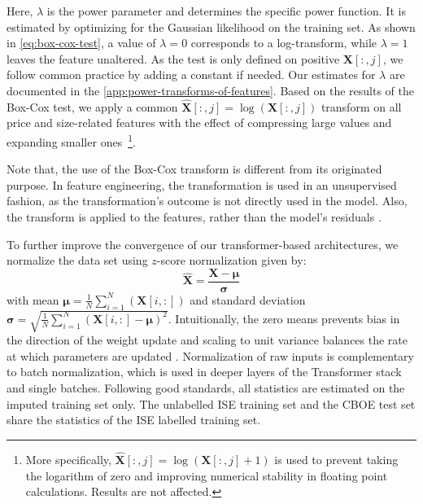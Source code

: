Here, $\lambda$ is the power parameter and determines the specific power function. It is estimated by optimizing for the Gaussian likelihood on the training set. As shown in \cref{eq:box-cox-test}, a value of $\lambda=0$ corresponds to a log-transform, while $\lambda=1$ leaves the feature unaltered. As the test is only defined on positive $\boldsymbol{X}\left[:,j\right]$, we follow common practice by adding a constant if needed. Our estimates for $\lambda$ are documented in the \cref{app:power-transforms-of-features}. Based on the results of the Box-Cox test, we apply a common $\widehat{\boldsymbol{X}}\left[:,j\right]=\log(\boldsymbol{X}\left[:,j\right])$ transform on all price and size-related features with the effect of compressing large values and expanding smaller ones~\footnote{More specifically, $\widehat{\boldsymbol{X}}\left[:,j\right]= \log(\boldsymbol{X}\left[:,j\right]+1)$ is used to prevent taking the logarithm of zero and improving numerical stability in floating point calculations. Results are not affected. }.

Note that, the use of the Box-Cox transform is different from its originated purpose. In feature engineering, the transformation is used in an unsupervised fashion, as the transformation's outcome is not directly used in the model. Also, the transform is applied to the features, rather than the model's residuals \autocite[122]{kuhnFeatureEngineeringSelection2020}.

To further improve the convergence of our transformer-based architectures, we normalize the data set using $z$-score normalization given by:
\begin{equation}
    \widehat{\boldsymbol{X}}=\frac{\boldsymbol{X}-\boldsymbol{\mu}}{\boldsymbol{\sigma}}
\end{equation}
with mean $\boldsymbol{\mu} =\frac{1}{N} \sum_{i=1}^N\left(\boldsymbol{X}\left[i,:\right]\right)$ and standard deviation $\boldsymbol{\sigma}=\sqrt{\frac{1}{N} \sum_{i=1}^N\left(\boldsymbol{X}\left[i,:\right]-\boldsymbol{\mu}\right)^2}$. Intuitionally, the zero means prevents bias in the direction of the weight update and scaling to unit variance balances the rate at which parameters are updated \autocite[][8]{lecunEfficientBackProp2012}. Normalization of raw inputs is complementary to batch normalization, which is used in deeper layers of the Transformer stack and single batches. Following good standards, all statistics are estimated on the imputed training set only. The unlabelled \gls{ISE} training set and the \gls{CBOE} test set share the statistics of the \gls{ISE} labelled training set. 

